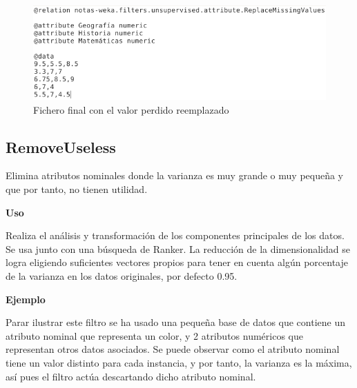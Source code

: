 	\begin{figure}[!htp]
	\centering
	\includegraphics[scale=.32]{./figuras/image31.png}
	\caption{Fichero final con el valor perdido reemplazado}
	\end{figure}

\newpage
\subsection{RemoveUseless}
	\begin{justify}
		Elimina atributos nominales donde la varianza es muy grande o muy pequeña y que por tanto, no tienen utilidad.
	\end{justify}



	\begin{justify}
	\textbf{Uso} 
	\end{justify}
	Realiza el análisis y transformación de los componentes principales de los datos. Se usa junto con una búsqueda de Ranker. La reducción de la dimensionalidad se logra eligiendo suficientes vectores propios para tener en cuenta algún porcentaje de la varianza en los datos originales, por defecto 0.95.

	\begin{justify}
	\textbf{Ejemplo}
	\end{justify}
	Parar ilustrar este filtro se ha usado una pequeña base de datos que contiene un atributo nominal que representa un color, y 2 atributos numéricos que representan otros datos asociados. Se puede observar como el atributo nominal tiene un valor distinto para cada instancia, y por tanto, la varianza es la máxima, así pues el filtro actúa descartando dicho atributo nominal.
  

